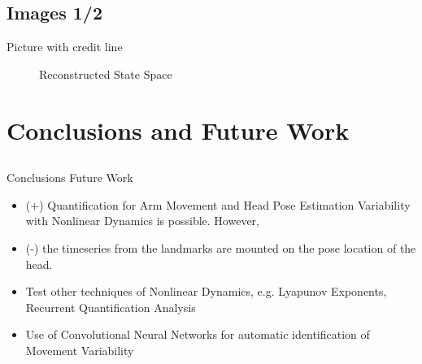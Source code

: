 \documentclass[compress]{beamer}
\begin{document}
\subsection{Images 1/2}
\begin{frame}{Picture with credit line}
    \begin{figure}
        \centering
	\caption{Reconstructed State Space} 
   \end{figure}
	
\end{frame}



\section{Conclusions and Future Work}

\subsection{}
{
\begin{frame}{Conclusions Future Work}

\begin{itemize}
	\item (+) Quantification for Arm Movement and Head Pose Estimation Variability with Nonlinear Dynamics is possible. However,
	\item (-) the timeseries from the landmarks are mounted on the pose location of the head. 
\end{itemize}

\begin{itemize}
	\item Test other techniques of Nonlinear Dynamics, e.g. Lyapunov Exponents, Recurrent Quantification Analysis
	\item Use of Convolutional Neural Networks for automatic identification of Movement Variability
\end{itemize}



\end{frame}
}
\end{document}
